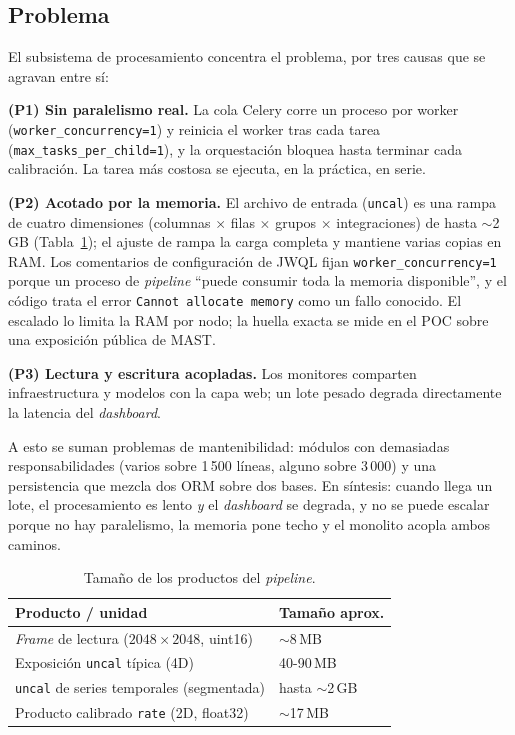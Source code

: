 \documentclass[conference]{IEEEtran}
\begin{document}
\subsection{Problema}

El subsistema de procesamiento concentra el problema, por tres causas que se agravan entre s\'i:

\textbf{(P1) Sin paralelismo real.} La cola Celery corre un proceso por worker (\texttt{worker\_concurrency=1}) y reinicia el worker tras cada tarea (\texttt{max\_tasks\_per\_child=1}), y la orquestaci\'on bloquea hasta terminar cada calibraci\'on. La tarea m\'as costosa se ejecuta, en la pr\'actica, en serie.

\textbf{(P2) Acotado por la memoria.} El archivo de entrada (\texttt{uncal}) es una rampa de cuatro dimensiones (columnas $\times$ filas $\times$ grupos $\times$ integraciones) de hasta $\sim$2\,GB (Tabla~\ref{tab:datos}); el ajuste de rampa la carga completa y mantiene varias copias en RAM. Los comentarios de configuraci\'on de JWQL fijan \texttt{worker\_concurrency=1} porque un proceso de \textit{pipeline} ``puede consumir toda la memoria disponible'', y el c\'odigo trata el error \texttt{Cannot allocate memory} como un fallo conocido. El escalado lo limita la RAM por nodo; la huella exacta se mide en el POC sobre una exposici\'on p\'ublica de MAST.

\textbf{(P3) Lectura y escritura acopladas.} Los monitores comparten infraestructura y modelos con la capa web; un lote pesado degrada directamente la latencia del \textit{dashboard}.

A esto se suman problemas de mantenibilidad: m\'odulos con demasiadas responsabilidades (varios sobre 1\,500 l\'ineas, alguno sobre 3\,000) y una persistencia que mezcla dos ORM sobre dos bases. En s\'intesis: cuando llega un lote, el procesamiento es lento \emph{y} el \textit{dashboard} se degrada, y no se puede escalar porque no hay paralelismo, la memoria pone techo y el monolito acopla ambos caminos.

\begin{table}[h]
\centering
\caption{Tama\~no de los productos del \textit{pipeline}.}
\label{tab:datos}
\begin{tabularx}{\columnwidth}{Xl}
\toprule
\textbf{Producto / unidad} & \textbf{Tama\~no aprox.} \\
\midrule
\textit{Frame} de lectura ($2048\times2048$, uint16) & $\sim$8\,MB \\
Exposici\'on \texttt{uncal} t\'ipica (4D) & 40-90\,MB \\
\texttt{uncal} de series temporales (segmentada) & hasta $\sim$2\,GB \\
Producto calibrado \texttt{rate} (2D, float32) & $\sim$17\,MB \\
\bottomrule
\end{tabularx}
\end{table}
\end{document}
